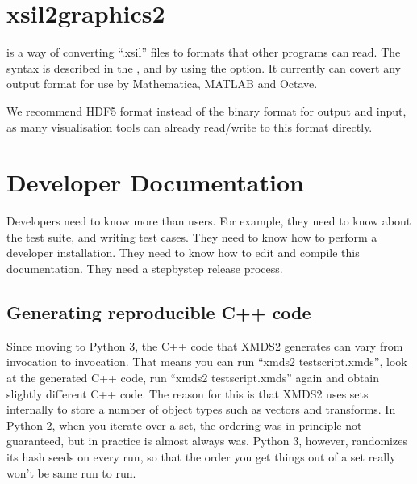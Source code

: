 \documentclass[letterpaper,10pt,english]{sphinxmanual}
\begin{document}
\ignorespaces 

\chapter{xsil2graphics2}
\label{\detokenize{xsil2graphics2:xsil2graphics2}}\label{\detokenize{xsil2graphics2:index-0}}\label{\detokenize{xsil2graphics2:id1}}\label{\detokenize{xsil2graphics2::doc}}
\sphinxAtStartPar
{} is a way of converting “.xsil” files to formats that other programs can read.  The syntax is described in the {\hyperref[\detokenize{tutorial:quickstarttutorial}]{}}, and by using the  option.  It currently can covert any output format for use by Mathematica, MATLAB and Octave.

\sphinxAtStartPar
We recommend HDF5 format instead of the binary format for output and input, as many visualisation tools can already read/write to this format directly.


\chapter{Developer Documentation}
\label{\detokenize{developer:developer-documentation}}\label{\detokenize{developer:developerdocumentation}}\label{\detokenize{developer::doc}}
\sphinxAtStartPar
Developers need to know more than users.  For example, they need to know about the test suite, and writing test cases.  They need to know how to perform a developer installation.  They need to know how to edit and compile this documentation.  They need a step\sphinxhyphen{}by\sphinxhyphen{}step release process.

\ignorespaces 

\section{Generating reproducible C++ code}
\label{\detokenize{developer:generating-reproducible-c-code}}\label{\detokenize{developer:reproducibleccode}}\label{\detokenize{developer:index-0}}
\sphinxAtStartPar
Since moving to Python 3, the C++ code that XMDS2 generates can vary from invocation to invocation. That means you can run “xmds2 testscript.xmds”, look at the generated C++ code, run “xmds2 testscript.xmds” again and obtain slightly different C++ code. The reason for this is that XMDS2 uses sets internally to store a number of object types such as vectors and transforms. In Python 2, when you iterate over a set, the ordering was in principle not guaranteed, but in practice is almost always was. Python 3, however, randomizes its hash seeds on every run, so that the order you get things out of a set really won’t be same run to run.
\end{document}
